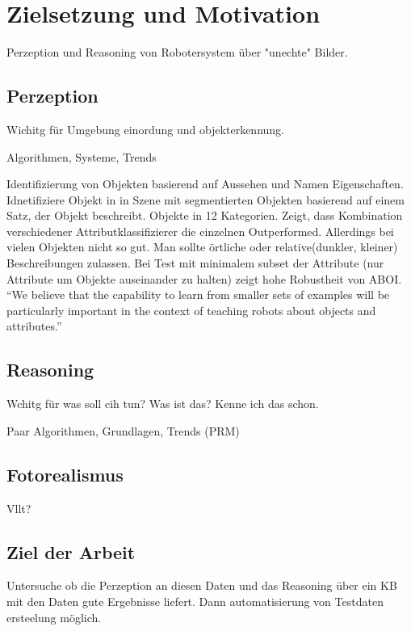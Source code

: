 \graphicspath{{./images/}}      
\def\CHAPTERONE{./chapters/Chapter-1} 

\chapter{Zielsetzung und Motivation}
\label{chap:motivation}
%	


Perzeption und Reasoning von Robotersystem über "unechte" Bilder.

\section{Perzeption}

Wichitg für Umgebung einordung und objekterkennung. 

Algorithmen, Systeme, Trends \par


\cite{descObjbyAtr}


\par

\cite{atrBasedObjIden} \newline
Identifizierung von Objekten basierend auf Aussehen und Namen Eigenschaften. \newline
Idnetifiziere Objekt in in Szene mit segmentierten Objekten basierend auf einem Satz, der Objekt beschreibt.  Objekte in 12 Kategorien. \newline
Zeigt, dass Kombination verschiedener Attributklassifizierer die einzelnen Outperformed. Allerdings bei vielen Objekten nicht so gut. Man sollte örtliche oder relative(dunkler, kleiner) Beschreibungen zulassen. Bei Test mit minimalem subset der Attribute (nur Attribute um Objekte auseinander zu halten) zeigt hohe Robustheit von ABOI.
``We believe that the capability to learn from smaller sets
of examples will be particularly important in the context of
teaching robots about objects and attributes.'' \par


\section{Reasoning}

Wchitg für was soll cih tun? Was ist das? Kenne ich das schon.

Paar Algorithmen, Grundlagen, Trends (PRM) 

\section{Fotorealismus}

Vllt?

\section{Ziel der Arbeit}
\label{sec:goal}

Untersuche ob die Perzeption an diesen Daten und das Reasoning über ein KB mit den Daten gute Ergebnisse liefert. Dann automatisierung von Testdaten ersteelung möglich. 